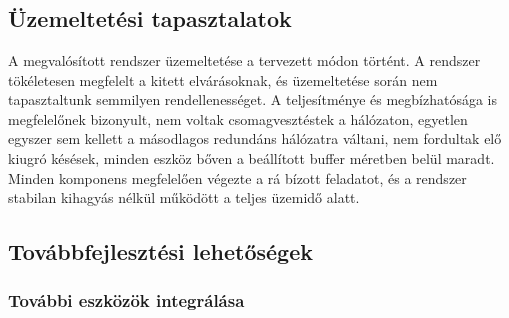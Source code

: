 \chapter{\FurtherDevelopment}

\section{Üzemeltetési tapasztalatok}

A megvalósított rendszer üzemeltetése a tervezett módon történt. A rendszer
tökéletesen megfelelt a kitett elvárásoknak, és üzemeltetése során nem
tapasztaltunk semmilyen rendellenességet. A teljesítménye és megbízhatósága is megfelelőnek bizonyult, nem 
voltak csomagvesztéstek a hálózaton, egyetlen egyszer sem kellett a másodlagos redundáns hálózatra
váltani, nem fordultak elő kiugró késések, minden eszköz bőven a beállított buffer méretben belül maradt.
Minden komponens megfelelően végezte a rá bízott feladatot, és a rendszer
stabilan kihagyás nélkül működött a teljes üzemidő alatt. 



\section{Továbbfejlesztési lehetőségek}


\subsection{További eszközök integrálása}


